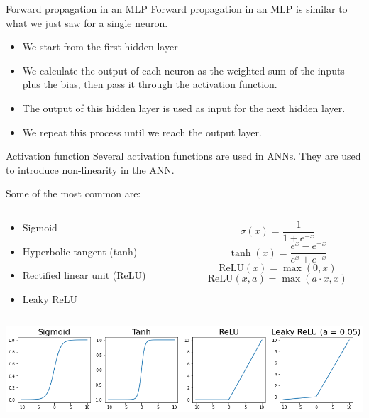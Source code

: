\documentclass[9pt, aspectratio=169]{beamer}
\begin{document}
\begin{frame}
    {Forward propagation in an MLP}
    Forward propagation in an MLP is similar to what we just saw for a single neuron.

    \pause

    \begin{itemize}[<+->]
        \item We start from the first hidden layer
        \item We calculate the output of each neuron as the weighted sum of the inputs plus the bias, then pass it through the activation function.
        \item The output of this hidden layer is used as input for the next hidden layer.
        \item We repeat this process until we reach the output layer.
    \end{itemize}

\end{frame}
\begin{frame}
    {Activation function}
    Several activation functions are used in ANNs. They are used to introduce non-linearity in the ANN.

    Some of the most common are:
    \begin{columns}
        \begin{column}{.5\textwidth}
            \begin{itemize}
                \item Sigmoid
                \item Hyperbolic tangent (tanh)
                \item Rectified linear unit (ReLU)
                \item Leaky ReLU
            \end{itemize}
        \end{column}
        \begin{column}{.5\textwidth}
            $$\sigma(x) = \frac{1}{1 + e^{-x}}$$
            $$\tanh(x) = \frac{e^{x} - e^{-x}}{e^{x} + e^{-x}}$$
            $$\text{ReLU}(x) = \max(0, x)$$
            $$\text{ReLU}(x, a) = \max(a\cdot x, x)$$
        \end{column}
    \end{columns}
    \centering
    \includegraphics[width=\textwidth]{activation.png}
\end{frame}
\end{document}
